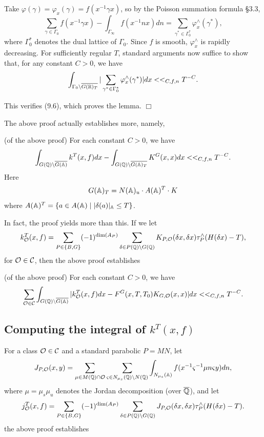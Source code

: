 Take $\varphi (\gamma )=\varphi _x(\gamma )=f(x^{-1}\gamma x)$, so by the
Poisson summation formula \S 3.3, 
\[
\sum_{\gamma \in \Gamma _0}f(x^{-1}\gamma x)-\int_{\Gamma _\infty
}f(x^{-1}nx)dn=\sum_{\gamma ^{*}\in \Gamma _0^{*}}\varphi _x^{\wedge
}(\gamma ^{*}), 
\]
where $\Gamma _0^{*}$ denotes the dual lattice of $\Gamma _0$. Since $f$ is
smooth, $\varphi _x^{\wedge }$ is rapidly decreasing. For sufficiently
regular $T$, standard arguments now suffice to show that, for any
constant $C>0$, we have 
\[
\int_{\Gamma _0\backslash \overline{G({\Bbb{R}})_T}}|\sum_{\gamma ^{*}\in
\Gamma _0^{*}}\varphi _x^{\wedge }(\gamma ^{*})|dx<<_{C,f,n}T^{-C}. 
\]

This verifies (9.6), which proves the lemma. $\Box $

The above proof actually establishes more, namely,

\begin{corollary}
(of the above proof) For each constant $C>0$, we have 
\[
\int_{G({\Bbb{Q}})\backslash \overline{G({\Bbb{A}})}}
k^T(x,f)dx-\int_{G({\Bbb{Q}})\backslash \overline{G({\Bbb{A}})_T}}
K^G(x,x)dx<<_{C,f,n}T^{-C}. 
\]
Here 
\[
G({\Bbb{A}})_T=N({\Bbb{A}})_u\cdot A({\Bbb{A}})^T\cdot K 
\]
where $A({\Bbb{A}})^T=\{a\in A({\Bbb{A}})\;|\;|\delta (a)|_{\Bbb A}\leq T\}$.
\end{corollary}

In fact, the proof yields more than this. If we let 
\[
k_{{\cal{O}}}^T(x,f)=\sum_{P\in \{B,G\}}(-1)^{\dim (A_P)}\sum_{\delta \in
P({\Bbb{Q}})\backslash G({\Bbb{Q}})}K_{P,{\cal{O}}}(\delta x,\delta x)\tau
_P^{\wedge }(H(\delta x)-T), 
\]
for ${\cal{O}}\in {\cal{C}}$, then the above proof establishes

\begin{corollary}
(of the above proof) For each constant $C>0$, we have 
\[
\sum_{{\cal{O}}\in {\cal{C}}}
\int_{G({\Bbb{Q}})\backslash \overline{G(\Bbb{A})}}
|k_{{\cal{O}}}^T(x,f)dx-F^G(x,T,T_0)
K_{G,{\cal{O}}}(x,x)|dx<<_{C,f,n}T^{-C}. 
\]
\end{corollary}

\subsection{Computing the integral of $k^T(x,f)$}

For a class ${\cal{O}}\in {\cal{C}}$ and a standard parabolic $P=MN$,
let 
\[
J_{P,{\cal{O}}}(x,y)=\sum_{\mu \in M({\Bbb{Q}})\cap {\cal{O}}%
}\sum_{\varsigma \in N_{\mu _s}({\Bbb{Q}})\backslash N({\Bbb{Q}})}\int_{N_{\mu
_s}({\Bbb{A}})}f(x^{-1}\varsigma ^{-1}\mu n\varsigma y)dn, 
\]
where $\mu =\mu _s\mu _u$ denotes the Jordan decomposition
(over $\overline{{\Bbb{Q}}}$), and let 
\[
j_{{\cal{O}}}^T(x,f)=\sum_{P\in \{B,G\}}(-1)^{\dim (A_P)}\sum_{\delta \in
P({\Bbb{Q}})\backslash G({\Bbb{Q}})}J_{P,{\cal{O}}}(\delta x,\delta x)\tau
_P^{\wedge }(H(\delta x)-T). 
\]
the above proof establishes

